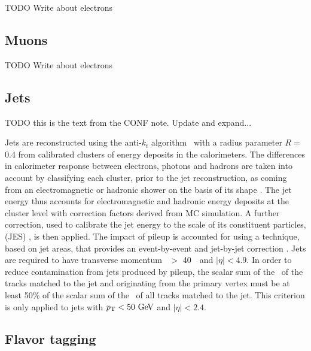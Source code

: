 {\color{red} TODO Write about electrons}

\FloatBarrier
\subsection{Muons} 
\label{sec:muons}

{\color{red} TODO Write about electrons}

\FloatBarrier
\subsection{Jets} 
\label{sec:jets}

{\color{red} TODO this is the text from the CONF note. Update and expand...}

Jets are reconstructed using the anti-$k_{t}$
algorithm~\cite{Cacciari:2008gp, Cacciari:2005hq} with a radius
parameter $R = $ 0.4 from calibrated clusters of energy deposits in
the calorimeters. The differences in calorimeter response between
electrons, photons and hadrons are taken into account by classifying
each cluster, prior to the jet reconstruction, as coming from an
electromagnetic or hadronic shower on the basis of its shape
\cite{JES}.  The jet energy thus accounts for electromagnetic
and hadronic energy deposits at the cluster level with correction
factors derived from MC simulation.  A further correction,
used to calibrate the jet energy to the scale of its constituent
particles, (JES) \cite{JES,JES2}, is then applied.  The impact of
pileup is accounted for using
a technique, based on jet areas, that provides an event-by-event and
jet-by-jet correction \cite{Cacciari:2007fd}.  Jets are required
to have transverse momentum \pt\ $>$ 40~\GeV\ and $|\eta| < 4.9$.
In order to reduce contamination from jets produced by pileup,
the scalar sum of the \pt\ of the tracks matched to the jet and
originating from the primary vertex must be at least 50\% of the
scalar sum of the \pt\ of all tracks matched to the jet.  This
criterion is only applied to jets with $\pt < 50 \GeV$ and $|\eta| < 2.4$.

\FloatBarrier
\subsection{Flavor tagging} 
\label{sec:flavor_tagging}

